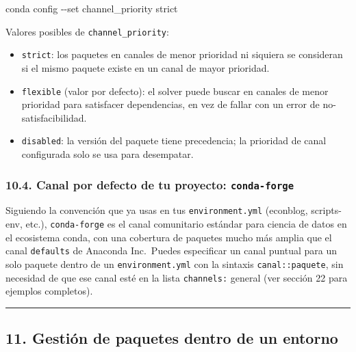 \documentclass[
  doc,
  floatsintext,
  longtable,
  a4paper,
  nolmodern,
  notxfonts,
  notimes,
  12pt,
  colorlinks=true,linkcolor=blue,citecolor=blue,urlcolor=blue]{apa7}
\newenvironment{Shaded}{\begin{snugshade}}{\end{snugshade}}
\newcommand{\AttributeTok}[1]{\textcolor[rgb]{0.40,0.45,0.13}{#1}}
\newcommand{\ExtensionTok}[1]{\textcolor[rgb]{0.00,0.23,0.31}{#1}}
\newcommand{\NormalTok}[1]{\textcolor[rgb]{0.00,0.23,0.31}{#1}}
\providecommand{\tightlist}{%
  \setlength{\itemsep}{0pt}\setlength{\parskip}{0pt}}
\begin{document}
\begin{Shaded}
\begin{Highlighting}[]
\ExtensionTok{conda}\NormalTok{ config }\AttributeTok{{-}{-}set}\NormalTok{ channel\_priority strict}
\end{Highlighting}
\end{Shaded}

Valores posibles de \texttt{channel\_priority}:

\begin{itemize}
\tightlist
\item
  \texttt{strict}: los paquetes en canales de menor prioridad ni
  siquiera se consideran si el mismo paquete existe en un canal de mayor
  prioridad.
\item
  \texttt{flexible} (valor por defecto): el solver puede buscar en
  canales de menor prioridad para satisfacer dependencias, en vez de
  fallar con un error de no-satisfacibilidad.
\item
  \texttt{disabled}: la versión del paquete tiene precedencia; la
  prioridad de canal configurada solo se usa para desempatar.
\end{itemize}

\subsubsection{\texorpdfstring{10.4. Canal por defecto de tu proyecto:
\texttt{conda-forge}}{10.4. Canal por defecto de tu proyecto: conda-forge}}\label{canal-por-defecto-de-tu-proyecto-conda-forge}

Siguiendo la convención que ya usas en tus \texttt{environment.yml}
(econblog, scripts-env, etc.), \texttt{conda-forge} es el canal
comunitario estándar para ciencia de datos en el ecosistema conda, con
una cobertura de paquetes mucho más amplia que el canal
\texttt{defaults} de Anaconda Inc.~Puedes especificar un canal puntual
para un solo paquete dentro de un \texttt{environment.yml} con la
sintaxis \texttt{canal::paquete}, sin necesidad de que ese canal esté en
la lista \texttt{channels:} general (ver sección 22 para ejemplos
completos).

\begin{center}\rule{0.5\linewidth}{0.5pt}\end{center}

\subsection{11. Gestión de paquetes dentro de un
entorno}\label{gestiuxf3n-de-paquetes-dentro-de-un-entorno}
\end{document}

